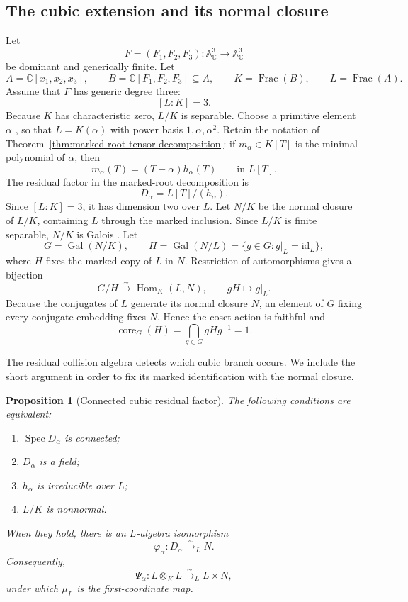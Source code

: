 \documentclass[11pt]{article}
\newtheorem{proposition}[theorem]{Proposition}
\theoremstyle{remark}
\DeclareMathOperator{\Spec}{Spec}
\DeclareMathOperator{\Frac}{Frac}
\DeclareMathOperator{\Gal}{Gal}
\DeclareMathOperator{\Hom}{Hom}
\DeclareMathOperator{\core}{core}
\newcommand{\A}{\mathbb A}
\newcommand{\C}{\mathbb C}
\newcommand{\id}{\mathrm{id}}
\begin{document}
\subsection{The cubic extension and its normal closure}
\label{sec:cubic-extension}

Let
\[
  F=(F_1,F_2,F_3)\colon\A^3_{\C}\longrightarrow\A^3_{\C}
\]
be dominant and generically finite.  Let
\[
  A=\C[x_1,x_2,x_3],
  \qquad
  B=\C[F_1,F_2,F_3]\subseteq A,
  \qquad
  K=\Frac(B),
  \qquad
  L=\Frac(A).
\]
Assume that \(F\) has generic degree three:
\[
  [L:K]=3.
\]
Because \(K\) has characteristic zero, \(L/K\) is separable.  Choose a
primitive element \(\alpha\)
\cite{StacksPrimitiveElement},
so that
\(L=K(\alpha)\) with power basis
\(1,\alpha,\alpha^2\).
Retain the notation of
Theorem~\ref{thm:marked-root-tensor-decomposition}: if \(m_\alpha\in K[T]\)
is the minimal polynomial of \(\alpha\), then
\[
  m_\alpha(T)=(T-\alpha)h_\alpha(T)
  \qquad\text{in }L[T].
\]
The residual factor in the marked-root decomposition is
\[
  D_\alpha=L[T]/(h_\alpha).
\]
Since \([L:K]=3\), it has dimension two over \(L\).
Let \(N/K\) be the normal closure of \(L/K\), containing \(L\) through
the marked inclusion.  Since \(L/K\) is finite separable, \(N/K\) is
Galois
\cite{StacksNormalClosureGalois}.
Let
\[
  G=\Gal(N/K),
  \qquad
  H=\Gal(N/L)=\{g\in G:g|_L=\id_L\},
\]
where \(H\) fixes the marked copy of \(L\) in \(N\).
Restriction of automorphisms gives a bijection
\[
  G/H\xrightarrow{\sim}\Hom_K(L,N),
  \qquad gH\longmapsto g|_L.
\]
Because the conjugates of \(L\) generate its normal closure \(N\), an
element of \(G\) fixing every conjugate embedding fixes \(N\).  Hence the
coset action is faithful and
\[
  \core_G(H)=\bigcap_{g\in G}gHg^{-1}=1.
\]

The residual collision algebra detects which cubic branch occurs.  We
include the short argument in order to fix its marked identification with
the normal closure.

\begin{proposition}[Connected cubic residual factor]
\label{prop:cubic-tensor-decomposition}
The following conditions are equivalent:
\begin{enumerate}[label=\textup{(\roman*)}]
  \item \(\Spec D_\alpha\) is connected;
  \item \(D_\alpha\) is a field;
  \item \(h_\alpha\) is irreducible over \(L\);
  \item \(L/K\) is nonnormal.
\end{enumerate}
When they hold, there is an \(L\)-algebra isomorphism
\[
  \varphi_\alpha\colon D_\alpha\xrightarrow{\sim}_L N.
\]
Consequently,
\[
  \Psi_\alpha\colon L\otimes_KL\xrightarrow{\sim}_L L\times N,
\]
under which \(\mu_L\) is the first-coordinate map.
\end{proposition}
\end{document}

